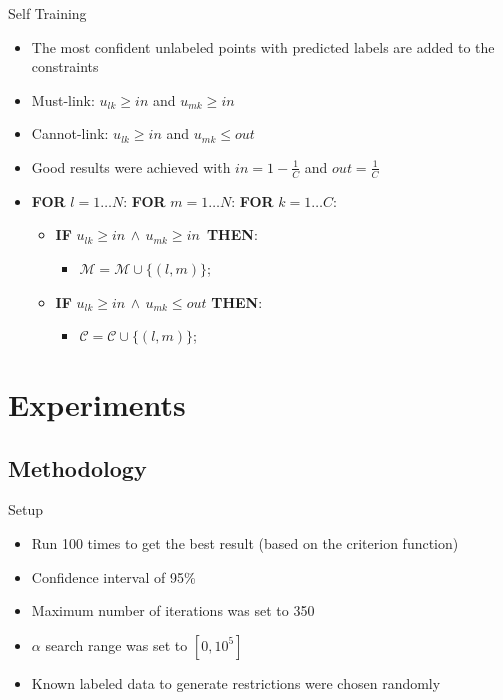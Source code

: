 \documentclass{beamer}
\begin{document}
\begin{frame}{Self Training}
	\begin{itemize}
		\item{The most confident unlabeled points with predicted labels are added to the constraints}
		\item{Must-link: $u_{lk} \geq in$ and $u_{mk} \geq in$}
		\item{Cannot-link: $u_{lk} \geq in$ and $u_{mk} \leq out$}
		\item{Good results were achieved with $in = 1 - \frac{1}{C}$ and $out = \frac{1}{C}$}
	\end{itemize}
	\begin{itemize}
		\item[]\textbf{FOR} $l = 1 \ldots N$: \textbf{FOR} $m = 1 \ldots N$: \textbf{FOR} $k = 1 \ldots C$:
	\begin{itemize}
		\item[]\textbf{IF} $u_{lk} \geq in \, \land \, u_{mk} \geq in \,$ \textbf{THEN}:
			\begin{itemize}	
				\item[]$\mathcal{M} = \mathcal{M} \cup\{(l,m)\}$;
			\end{itemize}	
		\item[]\textbf{IF} $u_{lk} \geq in \, \land \, u_{mk} \leq out$ \textbf{THEN}: 
			\begin{itemize}	
				\item[]$\mathcal{C} = \mathcal{C} \cup\{(l,m)\}$;
			\end{itemize}
		\end{itemize}
	\end{itemize}
\end{frame}

\section{Experiments}

\subsection{Methodology}

%
%
\begin{frame}{Setup}
	\begin{itemize}
		\item{Run 100 times to get the best result (based on the criterion function)}
		\item{Confidence interval of 95\%}
		\item{Maximum number of iterations was set to 350}
		\item{$\alpha$ search range was set to $[0,10^{5}]$}
		\item{Known labeled data to generate restrictions were chosen randomly}
	\end{itemize}
\end{frame}
\end{document}
